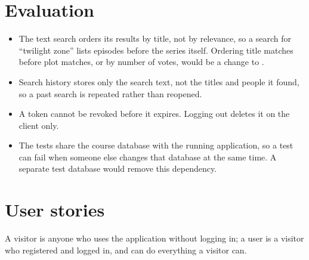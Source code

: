 \documentclass[11pt,a4paper]{article}
\newcommand{\tb}[1]{\texttt{\detokenize{#1}}}
\begin{document}
\section{Evaluation}\label{sec:beeval}
\begin{itemize}
  \item The text search orders its results by title, not by relevance, so a search for ``twilight zone'' lists episodes before the series itself. Ordering title matches before plot matches, or by number of votes, would be a change to \tb{string_search}.
  \item Search history stores only the search text, not the titles and people it found, so a past search is repeated rather than reopened.
  \item A token cannot be revoked before it expires. Logging out deletes it on the client only.
  \item The tests share the course database with the running application, so a test can fail when someone else changes that database at the same time. A separate test database would remove this dependency.
\end{itemize}

\clearpage
\appendix
\renewcommand{\thesection}{\Alph{section}}
\section{User stories}\label{app:stories}
A visitor is anyone who uses the application without logging in; a user is a visitor who registered and logged in, and can do everything a visitor can.
\end{document}
